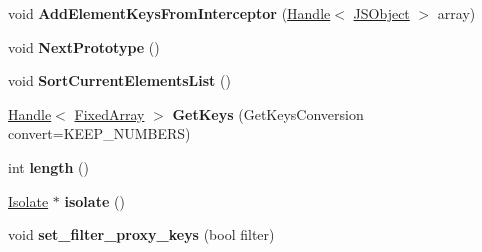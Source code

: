 \begin{DoxyCompactItemize}
\item 
void {\bfseries Add\+Element\+Keys\+From\+Interceptor} (\hyperlink{classv8_1_1internal_1_1_handle}{Handle}$<$ \hyperlink{classv8_1_1internal_1_1_j_s_object}{J\+S\+Object} $>$ array)\hypertarget{classv8_1_1internal_1_1_b_a_s_e___e_m_b_e_d_d_e_d_af4b112fc269196b851ecca9e59835c40}{}\label{classv8_1_1internal_1_1_b_a_s_e___e_m_b_e_d_d_e_d_af4b112fc269196b851ecca9e59835c40}

\item 
void {\bfseries Next\+Prototype} ()\hypertarget{classv8_1_1internal_1_1_b_a_s_e___e_m_b_e_d_d_e_d_ad05a587cdf3e0a2efd91725c975af77b}{}\label{classv8_1_1internal_1_1_b_a_s_e___e_m_b_e_d_d_e_d_ad05a587cdf3e0a2efd91725c975af77b}

\item 
void {\bfseries Sort\+Current\+Elements\+List} ()\hypertarget{classv8_1_1internal_1_1_b_a_s_e___e_m_b_e_d_d_e_d_a0e2c2dba0a51a8707e22184ccc447d3f}{}\label{classv8_1_1internal_1_1_b_a_s_e___e_m_b_e_d_d_e_d_a0e2c2dba0a51a8707e22184ccc447d3f}

\item 
\hyperlink{classv8_1_1internal_1_1_handle}{Handle}$<$ \hyperlink{classv8_1_1internal_1_1_fixed_array}{Fixed\+Array} $>$ {\bfseries Get\+Keys} (Get\+Keys\+Conversion convert=K\+E\+E\+P\+\_\+\+N\+U\+M\+B\+E\+RS)\hypertarget{classv8_1_1internal_1_1_b_a_s_e___e_m_b_e_d_d_e_d_a12a45ba8b420c7ba3158c5731bd472d8}{}\label{classv8_1_1internal_1_1_b_a_s_e___e_m_b_e_d_d_e_d_a12a45ba8b420c7ba3158c5731bd472d8}

\item 
int {\bfseries length} ()\hypertarget{classv8_1_1internal_1_1_b_a_s_e___e_m_b_e_d_d_e_d_a6589b0e81a4c577b6dac4e5c8135a026}{}\label{classv8_1_1internal_1_1_b_a_s_e___e_m_b_e_d_d_e_d_a6589b0e81a4c577b6dac4e5c8135a026}

\item 
\hyperlink{classv8_1_1internal_1_1_isolate}{Isolate} $\ast$ {\bfseries isolate} ()\hypertarget{classv8_1_1internal_1_1_b_a_s_e___e_m_b_e_d_d_e_d_a32ada69909c248ae5d86cb56b08a5cc9}{}\label{classv8_1_1internal_1_1_b_a_s_e___e_m_b_e_d_d_e_d_a32ada69909c248ae5d86cb56b08a5cc9}

\item 
void {\bfseries set\+\_\+filter\+\_\+proxy\+\_\+keys} (bool filter)\hypertarget{classv8_1_1internal_1_1_b_a_s_e___e_m_b_e_d_d_e_d_ab3a62c93b59d0add4f8f6257aa5852ac}{}\label{classv8_1_1internal_1_1_b_a_s_e___e_m_b_e_d_d_e_d_ab3a62c93b59d0add4f8f6257aa5852ac}


\end{DoxyCompactItemize}
